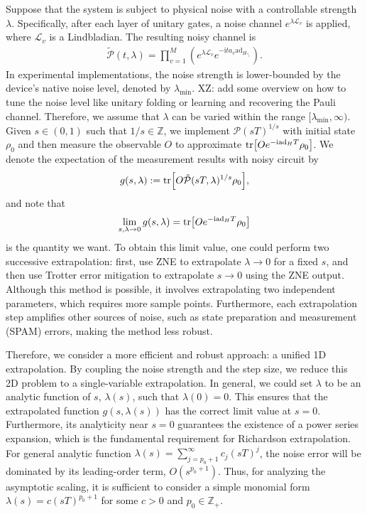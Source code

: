 \documentclass[11pt]{article}
\renewcommand{\i}{\mathrm{i}}
\newcommand{\ad}{\mathrm{ad}}
\renewcommand{\P}{\mathcal{P}}
\newcommand{\mc}{\mathcal}
\newcommand{\mb}{\mathbb}
\newcommand{\xz}[1]{{\color{cyan} XZ: #1}}
\begin{document}
Suppose that the system is subject to physical noise with a controllable strength $\lambda$. Specifically, after each layer of unitary gates, a noise channel $e^{\lambda \mc L_{v}}$ is applied, where $\mc L_{v}$ is a Lindbladian. The resulting noisy channel is
\begin{align*}
    \tilde{\P}(t,\lambda)=\prod_{v=1}^M\left( e^{\lambda \mc L_{v}} e^{-\i t a_{v} \ad_{H_{\gamma_v}}} \right).
\end{align*} 
In experimental implementations, the noise strength is lower-bounded by the device's native noise level, denoted by $\lambda_{\min}$. \xz{add some overview on how to tune the noise level like unitary folding or learning and recovering the Pauli channel.} Therefore, we assume that $\lambda$ can be varied within the range $[\lambda_{\min}, \infty)$. 
Given $s\in (0,1)$ such that $1/s\in \mathbb{Z}$, we implement $\mc P(sT)^{1/s}$ with initial state $\rho_0$ and then measure the observable $O$ to approximate $\tr[Oe^{-\i \ad_H T}\rho_0]$. We denote the expectation of the measurement results with noisy circuit by  \begin{align*}
    g(s,\lambda) := \tr[O\tilde{\mc P}(sT,\lambda)^{1/s}\rho_0],
\end{align*}
and note that \begin{align*}
    \lim_{s,\lambda\to 0} g(s,\lambda) = \tr[Oe^{-\i \ad_H T}\rho_0]
\end{align*}
is the quantity we want. To obtain this limit value, one could perform two successive extrapolation: first, use ZNE to extrapolate $\lambda \to 0$ for a fixed $s$, and then use Trotter error mitigation \cite{watson2025exponentially} to extrapolate $s \to 0$ using the ZNE output. Although this method is possible, it involves extrapolating two independent parameters, which requires more sample points. Furthermore, each extrapolation step amplifies other sources of noise, such as state preparation and measurement (SPAM) errors, making the method less robust.

Therefore, we consider a more efficient and robust approach: a unified 1D extrapolation. By coupling the noise strength and the step size, we reduce this 2D problem to a single-variable extrapolation. In general, we could set $\lambda$ to be an analytic function of $s$, $\lambda(s)$, such that $\lambda(0)=0$. This ensures that the extrapolated function $g(s,\lambda(s))$ has the correct limit value at $s = 0$. Furthermore, its analyticity near $s=0$ guarantees the existence of a power series expansion, which is the fundamental requirement for Richardson extrapolation. For general analytic function $\lambda(s) =\sum_{j=p_0+1}^{\infty} c_j (sT)^j$, the noise error will be dominated by its leading-order term, $O(s^{p_0+1})$. Thus, for analyzing the asymptotic scaling, it is sufficient to consider a simple monomial form  $\lambda(s) = c(sT)^{p_0+1}$ for some $c>0$ and $p_0\in \mb{Z}_+$.
\end{document}
